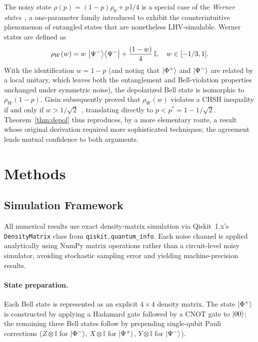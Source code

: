 \documentclass[12pt]{article}
\newcommand{\Phiplus}{\ket{\Phi^+}}
\newcommand{\Phiminus}{\ket{\Phi^-}}
\newcommand{\Psiplus}{\ket{\Psi^+}}
\newcommand{\Psiminus}{\ket{\Psi^-}}
\newcommand{\pstar}{p^*}
\newcommand{\Id}{\mathbb{I}}
\begin{document}
The noisy state $\rho(p) = (1-p)\rho_0 + p\,\Id/4$ is a special case of the
\textit{Werner states}~\cite{werner1989}, a one-parameter family introduced to
exhibit the counterintuitive phenomenon of entangled states that are nonetheless LHV-simulable.
Werner states are defined as
\begin{equation}
  \rho_W(w) = w\,\ket{\Psi^-}\!\bra{\Psi^-} + \frac{(1-w)}{4}\,\Id,\quad w \in [-1/3, 1].
  \label{eq:werner}
\end{equation}
With the identification $w = 1-p$ (and noting that $\Phiplus$ and $\Psiminus$ are related by
a local unitary, which leaves both the entanglement and Bell-violation properties unchanged under
symmetric noise), the depolarized Bell state is isomorphic to $\rho_W(1-p)$.
Gisin subsequently proved that $\rho_W(w)$ violates a CHSH inequality if and only if
$w > 1/\!\sqrt{2}$~\cite{gisin1991}, translating directly to $p < \pstar = 1 - 1/\!\sqrt{2}$.
Theorem~\ref{thm:depol} thus reproduces, by a more elementary route,
a result whose original derivation required more sophisticated techniques; the agreement
lends mutual confidence to both arguments.

\section{Methods}
\label{sec:methods}

\subsection{Simulation Framework}
\label{subsec:simulation}

All numerical results use exact density-matrix simulation via Qiskit~1.x's
\texttt{DensityMatrix} class from \texttt{qiskit.quantum\_info}.
Each noise channel is applied analytically using NumPy matrix operations rather than a
circuit-level noisy simulator, avoiding stochastic sampling error and yielding machine-precision
results.

\paragraph{State preparation.}
Each Bell state is represented as an explicit $4\times 4$ density matrix.
The state $\Phiplus$ is constructed by applying a Hadamard gate followed by a CNOT gate to
$\ket{00}$; the remaining three Bell states follow by prepending single-qubit Pauli corrections
($Z\otimes\Id$ for $\Phiminus$, $X\otimes\Id$ for $\Psiplus$, $Y\otimes\Id$ for $\Psiminus$).
\end{document}
